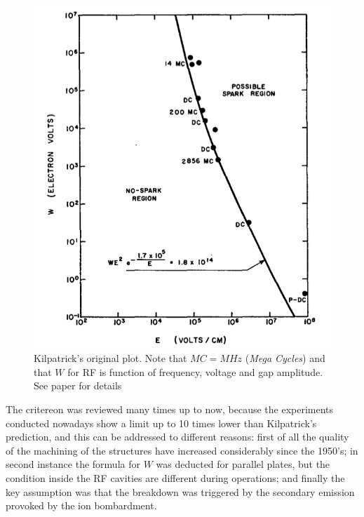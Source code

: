 \begin{figure}[h]
\centering

\includegraphics[scale=0.4]{pictures/kilpatrickCrit}
\caption{Kilpatrick's original plot. Note that $MC = MHz$ (\textit{Mega Cycles}) and that $W$ for RF is function of frequency, voltage and gap amplitude.\\ See paper for details  \cite{KilpLimit}}
\label{kilpPlot}

\end{figure}

The critereon was reviewed many times up to now, because the experiments conducted nowadays show a limit up to 10 times lower than Kilpatrick's prediction, and this can be addressed to different reasons: first of all the quality of the machining of the structures have increased considerably since the 1950's; in second instance the formula for $W$ was deducted for parallel plates, but the condition inside the RF cavities are different during operations; and finally the key assumption was that the breakdown was triggered by the secondary emission provoked by the ion bombardment.


